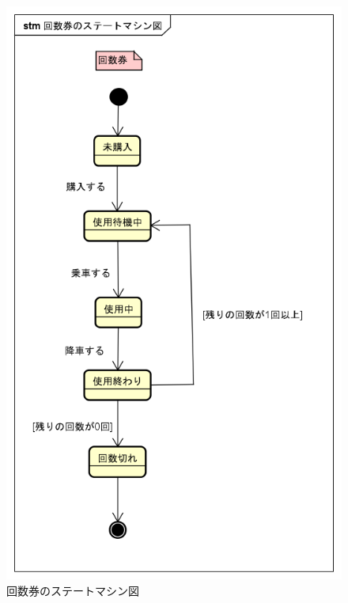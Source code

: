 \documentclass[documentclass]{jsarticle}
\begin{document}
\begin{figure}[h]
  \centering
  \begin{minipage}[b]{0.49\columnwidth}
      \centering
      \includegraphics[width=0.9\columnwidth]{figure/8-1.png}
      \caption{回数券のステートマシン図}
      \label{fig:8-1}
  \end{minipage}
  \begin{minipage}[b]{0.49\columnwidth}
      \centering

\end{minipage}
\end{figure}
\end{document}

